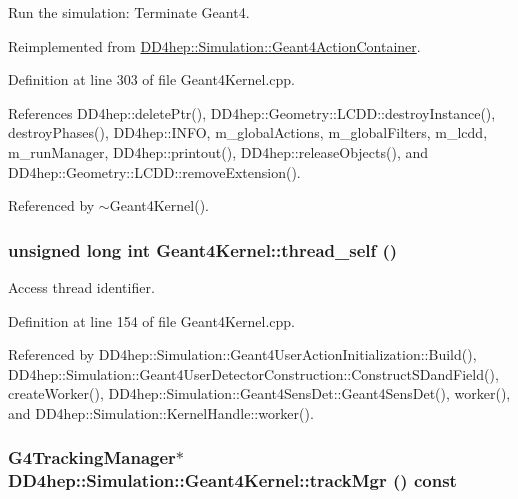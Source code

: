 Run the simulation: Terminate Geant4. 

Reimplemented from \hyperlink{class_d_d4hep_1_1_simulation_1_1_geant4_action_container_ad9cfc3e1bc35d384f5dbd4e8747ddf69}{DD4hep::Simulation::Geant4ActionContainer}.

Definition at line 303 of file Geant4Kernel.cpp.

References DD4hep::deletePtr(), DD4hep::Geometry::LCDD::destroyInstance(), destroyPhases(), DD4hep::INFO, m\_\-globalActions, m\_\-globalFilters, m\_\-lcdd, m\_\-runManager, DD4hep::printout(), DD4hep::releaseObjects(), and DD4hep::Geometry::LCDD::removeExtension().

Referenced by $\sim$Geant4Kernel().\hypertarget{class_d_d4hep_1_1_simulation_1_1_geant4_kernel_a6f7fb6760f8432658a837a65bb557fe5}{
\subsubsection[{thread\_\-self}]{\setlength{\rightskip}{0pt plus 5cm}unsigned long int Geant4Kernel::thread\_\-self ()}}
\label{class_d_d4hep_1_1_simulation_1_1_geant4_kernel_a6f7fb6760f8432658a837a65bb557fe5}


Access thread identifier. 

Definition at line 154 of file Geant4Kernel.cpp.

Referenced by DD4hep::Simulation::Geant4UserActionInitialization::Build(), DD4hep::Simulation::Geant4UserDetectorConstruction::ConstructSDandField(), createWorker(), DD4hep::Simulation::Geant4SensDet::Geant4SensDet(), worker(), and DD4hep::Simulation::KernelHandle::worker().\hypertarget{class_d_d4hep_1_1_simulation_1_1_geant4_kernel_a4cef97fec68194bc070962cefc05d17c}{
\subsubsection[{trackMgr}]{\setlength{\rightskip}{0pt plus 5cm}G4TrackingManager$\ast$ DD4hep::Simulation::Geant4Kernel::trackMgr () const}}
\label{class_d_d4hep_1_1_simulation_1_1_geant4_kernel_a4cef97fec68194bc070962cefc05d17c}


